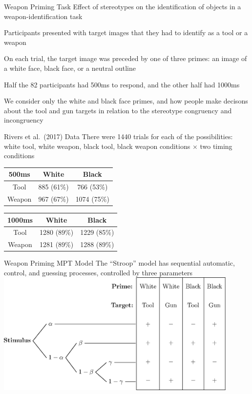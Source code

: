 \documentclass[aspectratio=169]{beamer}
\begin{document}
\begin{frame}[fragile]{Weapon Priming Task}
Effect of stereotypes on the identification of objects in a weapon-identification task\pause

Participants presented with target images that they had to identify as a tool or a weapon\pause

On each trial, the target image was preceded by one of three primes: an image of a white face, black face, or a neutral outline\pause

Half the 82 participants had 500ms to respond, and the other half had 1000ms\pause

We consider only the white and black face primes, and how people make decisons about the tool and gun  targets in relation to the stereotype congruency and incongruency
\end{frame}

\begin{frame}[fragile]{Rivers et al.\ (2017) Data}
There were 1440 trials for each of the possibilities: white tool, white weapon, black tool, black weapon
conditions $\times$ two timing conditions

\begin{center}
\begin{tabular}{ccc}
\toprule
500ms & White & Black \\
\hline
 Tool & 885 (61\%) & 766 (53\%)\\
 Weapon & 967 (67\%) & 1074 (75\%) \\
\bottomrule
\end{tabular}
\end{center}

\begin{center}
\begin{tabular}{ccc}
\toprule
1000ms & White & Black \\
\hline
 Tool & 1280 (89\%) & 1229 (85\%)\\
 Weapon & 1281 (89\%) & 1288 (89\%) \\
\bottomrule
\end{tabular}
\end{center}

\end{frame}

\begin{frame}[fragile]{Weapon Priming MPT Model}
The ``Stroop'' model has sequential automatic, control, and guessing processes, controlled by three parameters
\includegraphics[width = 0.9\textwidth]{figures/weaponPriming.eps}
\end{frame}
\end{document}
